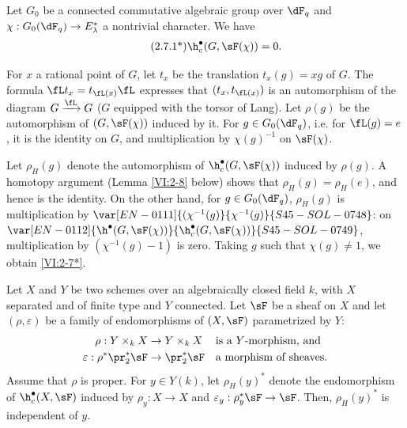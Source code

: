 \begin{theorem*}[2.7*]\label{VI:2-7*}
Let $G_0$ be a connected commutative algebraic group over $\dF_q$ and 
$\chi:G_0(\dF_q) \to E_\lambda^\ast$ a nontrivial character. We have 
\begin{align*}\tag{2.7.1*}\label{VI:eq:2-7-1*}
  \h_c^\bullet(G,\sF(\chi)) = 0 \text{.}
\end{align*}
\end{theorem*}

For $x$ a rational point of $G$, let $t_x$ be the translation $t_x(g) = x g$ 
of $G$. The formula $\fL t_x = t_{\fL(x)} \fL$ expresses that $(t_x,t_{\fL(x)})$ 
is an automorphism of the diagram $G\xrightarrow\fL G$ ($G$ equipped with the torsor of 
Lang). Let $\rho(g)$ be the automorphism of $(G,\sF(\chi))$ induced by it. 
For $g\in G_0(\dF_q)$, i.e. for $\fL(g) = e$, it is the identity on $G$, and 
multiplication by $\chi(g)^{-1}$ on $\sF(\chi)$. 

Let $\rho_H(g)$ denote the automorphism of $\h_c^\bullet(G,\sF(\chi))$ induced by 
$\rho(g)$. A homotopy argument (Lemma \ref{VI:2-8} below) shows that 
$\rho_H(g) = \rho_H(e)$, and hence is the identity. On the other hand, for 
$g\in G_0(\dF_q)$, $\rho_H(g)$ is multiplication by 
$\var[EN-0111]{(\chi^{-1}(g)}{\chi^{-1}(g)}{S45-SOL-0748}$: on $\var[EN-0112]{\h^\bullet(G,\sF(\chi))}{\h_c^\bullet(G,\sF(\chi))}{S45-SOL-0749}$, multiplication by 
$(\chi^{-1}(g)-1)$ is zero. Taking $g$ such that $\chi(g)\ne 1$, we obtain 
\ref{VI:2-7*}. 





\begin{lemma_}\label{VI:2-8}
Let $X$ and $Y$ be two schemes over an algebraically closed field $k$, with $X$ 
separated and of finite type and $Y$ connected. Let $\sF$ be a sheaf on $X$ and 
let $(\rho,\varepsilon)$ be a family of endomorphisms of $(X,\sF)$ parametrized 
by $Y$: 
\begin{align*} 
  \rho:Y\times_k X &\to Y\times_k X && \text{is a $Y$-morphism, and} \\
  \varepsilon:\rho^\ast \pr_2^\ast \sF &\to \pr_2^\ast\sF && \text{a morphism of sheaves.} 
\end{align*}
Assume that $\rho$ is proper. For $y\in Y(k)$, let $\rho_H(y)^\ast$ denote 
the endomorphism of $\h_c^\bullet(X,\sF)$ induced by $\rho_y:X\to X$ and 
$\varepsilon_y:\rho_y^\ast\sF\to \sF$. Then, $\rho_H(y)^\ast$ is 
independent of $y$. 
\end{lemma_}

